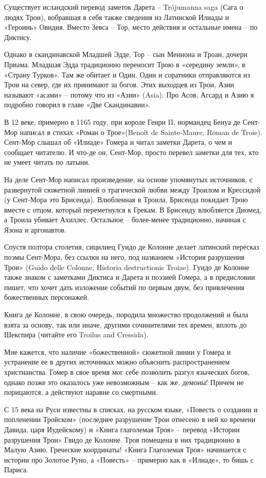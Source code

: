 Существует исландский перевод заметок Дарета – Trójumanna saga (Сага о людях Трои), вобравшая в себя также сведения из Латинской Илиады и «Героинь» Овидия. Вместо Зевса – Тор, место действия и остальные имена – по Диктису.

Однако в скандинавской Младшей Эдде, Тор – сын Меннона и Троан, дочери Приама. Младшая Эдда традиционно переносит Трою в «середину земли», в «Страну Турков». Там же обитает и Один. Один и соратники отправляются из Трои на север, где их принимают за богов. Этих выходцев из Трои, Азии называют «асами» – потому что из «Азии» (Asia). Про Асов, Агсард и Азию я подробно говорил в главе «Две Скандинавии».

В 12 веке, примерно в 1165 году, при короле Генри II, нормандец Бенуа де Сент-Мор написал в стихах «Роман о Трое»(Benoît de Sainte-Maure, Roman de Troie). Сент-Мор слышал об «Илиаде» Гомера и читал заметки Дарета, о чем и сообщает читателю. И что-де он, Сент-Мор, просто перевел заметки для тех, кто не умеет читать по латыни.

На деле Сент-Мор написал произведение, на основе упомянутых источников, с развернутой сюжетной линией о трагической любви между Троилом и Крессидой (у Сент-Мора это Брисеида). Влюбленная в Троила, Брисеида покидает Трою вместе с отцом, который переметнулся к Грекам. В Брисеиду влюбляется Диомед, а Троила убивает Ахиллес. Остальное – более-менее традиционно, начиная с Язона и аргонавтов.

Спустя полтора столетия, сицилиец Гуидо де Колонне делает латинский пересказ поэмы Сент-Мора, без ссылки на него, под названием «История разрушения Трои» (Guido delle Colonne, Historia destructionis Troiae). Гуидо де Колонне также знаком с заметками Диктиса и Дарета и поэзией Гомера, а в предисловии пишет, что хочет дать изложение событий по первым двум, без привлечения божественных персонажей.

Книга де Колонне, в свою очередь, породила множество продолжений и была взята за основу, так или иначе, другими сочинителями тех времен, вплоть до Шекспира (читайте его Troilus and Cressida).

Мне кажется, что наличие «божественной» сюжетной линии у Гомера и устранение ее в других источниках можно объяснить распространением христианства. Гомер в свое время мог себе позволить разгул языческих богов, однако позже это оказалось уже невозможным – как же, демоны! Причем не порицаются, а действуют наравне со смертными.

С 15 века на Руси известны в списках, на русском языке, «Повесть о создании и попленении Тройском» (последнее разрушение Трои отнесено в ней ко времени Давида, царя Иудейскому) и «Книга глаголемая Троя» – перевод «Истории разрушения Трои» Гвидо де Колонне. Троя помещена в них традиционно в Малую Азию. Греческие координаты! «Книга Глаголемая Троя» начинается с истории про Золотое Руно, а «Повесть» – примерно как в «Илиаде», то бишь с Париса.

